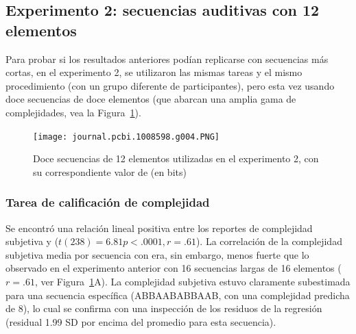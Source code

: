 \subsection{Experimento 2: secuencias auditivas con 12 elementos}
\label{ploscomp-results-exp2}


Para probar si los resultados anteriores podían replicarse con secuencias más cortas, en el experimento 2, se utilizaron las mismas tareas y el mismo procedimiento (con un grupo diferente de participantes), pero esta vez usando doce secuencias de doce elementos (que abarcan una amplia gama de complejidades, vea la Figura~\ref{PlosBIO-F4}).

\begin{figure}[t!]
   \texttt{[image: journal.pcbi.1008598.g004.PNG]}
   \centering
   \caption{Doce secuencias de 12 elementos utilizadas en el experimento 2, con su correspondiente valor de \mdlbin (en bits)}
   \label{PlosBIO-F4}
\end{figure}

\subsubsection*{Tarea de calificación de complejidad}


Se encontró una relación lineal positiva entre los reportes de complejidad subjetiva y \mdlbin ($t(238) = 6.81 p < .0001, r = .61$). La correlación de la complejidad subjetiva media por secuencia con \mdlbin era, sin embargo, menos fuerte que lo observado en el experimento anterior con 16 secuencias largas de 16 elementos ($r = .61$, ver Figura~\ref{PlosBIO-F4}A). La complejidad subjetiva estuvo claramente subestimada para una secuencia específica (ABBAABABBAAB, con una complejidad predicha de 8), lo cual se confirma con una inspección de los residuos de la regresión (residual 1.99 SD por encima del promedio para esta secuencia).


